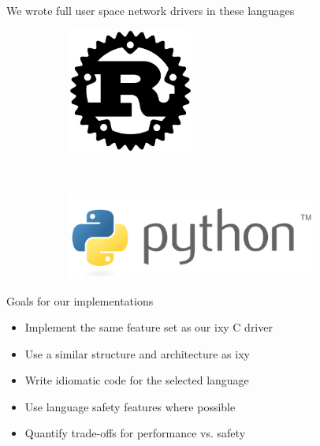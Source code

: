 \documentclass[NET,english,aspectratio=169,notitleframe]{tumbeamer}
\begin{document}
\begin{frame}{We wrote full user space network drivers in these languages}
\begin{figure}
\begin{subfigure}[t]{0.2\columnwidth}
        \centering
        \includegraphics[width=0.45\textwidth]{pics/rust}
    \end{subfigure}
    ~ 
    \begin{subfigure}[t]{0.3\columnwidth}
	\centering
        \includegraphics[width=0.9\textwidth]{pics/python}
    \end{subfigure}
\end{figure}
\end{frame}

\begin{frame}{Goals for our implementations}
\begin{itemize}
\item Implement the same feature set as our ixy C driver
\item Use a similar structure and architecture as ixy
\item Write idiomatic code for the selected language
\item Use language safety features where possible
\item Quantify trade-offs for performance vs. safety
\end{itemize}
\end{frame}
\end{document}
